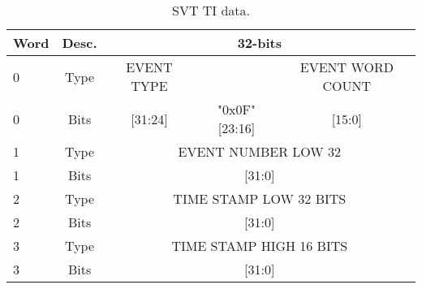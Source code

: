 \documentclass{desyproc}
\begin{document}
\begin{table}[]
  \begin{center}
    \caption{SVT TI  data.}
    \label{tab:svt-ti-data}
    \begin{tabular}{|l|c|c|c|c|}
   	\hline
    	\bf Word & \bf Desc. & \multicolumn{3}{|c|}{\bf 32-bits}\\
      	\hline
    	 0 &  Type & EVENT TYPE &  & EVENT WORD COUNT\\
	\hline
    	 0 &  Bits & [31:24] & "0x0F" [23:16] & [15:0]\\
	\hline
    	 1 &  Type & \multicolumn{3}{|c|}{ EVENT NUMBER LOW 32}\\
	\hline
    	 1 & Bits &  \multicolumn{3}{|c|}{ [31:0]}\\
	\hline
    	 2 &  Type & \multicolumn{3}{|c|}{ TIME STAMP LOW 32 BITS}\\
	\hline
    	 2 &  Bits & \multicolumn{3}{|c|}{ [31:0]}\\
	\hline
    	 3 &  Type & \multicolumn{3}{|c|}{ TIME STAMP HIGH 16 BITS}\\
	\hline
    	 3 &  Bits & \multicolumn{3}{|c|}{ [31:0]}\\
	\hline
      \end{tabular}
  \end{center}
\end{table}
\end{document}
